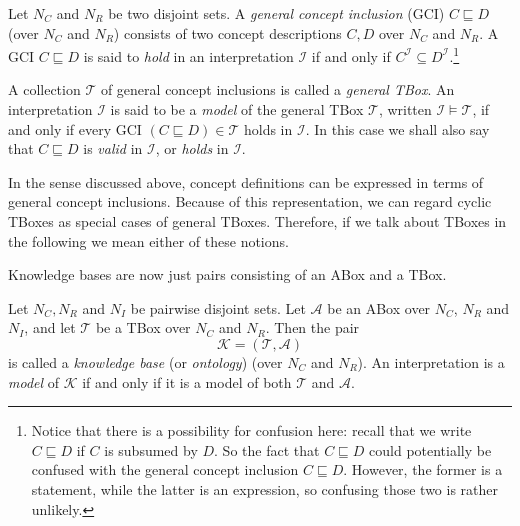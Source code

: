 \begin{Definition}
  \label{def:general-concept-inclusions-and-general-TBoxes}
  Let $N_C$ and $N_R$ be two disjoint sets.  A \emph{general concept inclusion} (GCI) $C
  \sqsubseteq D$ (over $N_C$ and $N_R$) consists of two concept descriptions $C, D$ over
  $N_C$ and $N_R$.  A GCI $C \sqsubseteq D$ is said to \emph{hold} in an interpretation
  $\mathcal{I}$ if and only if $C^{\mathcal{I}} \subseteq
  D^{\mathcal{I}}$.\footnote{Notice that there is a possibility for confusion here: recall
    that we write $C \sqsubseteq D$ if $C$ is subsumed by $D$.  So the fact that $C
    \sqsubseteq D$ could potentially be confused with the general concept inclusion $C
    \sqsubseteq D$.  However, the former is a statement, while the latter is an
    expression, so confusing those two is rather unlikely.}

  A collection $\mathcal{T}$ of general concept inclusions is called a \emph{general
    TBox}.  An interpretation $\mathcal{I}$ is said to be a \emph{model} of the general
  TBox $\mathcal{T}$, written $\mathcal{I} \models \mathcal{T}$, if and only if every GCI
  $(C \sqsubseteq D) \in \mathcal{T}$ holds in $\mathcal{I}$.  In this case we shall also
  say that $C \sqsubseteq D$ is \emph{valid} in $\mathcal{I}$, or \emph{holds} in
  $\mathcal{I}$.
\end{Definition}

In the sense discussed above, concept definitions can be expressed in terms of general
concept inclusions.  Because of this representation, we can regard cyclic TBoxes as
special cases of general TBoxes.  Therefore, if we talk about TBoxes in the following we
mean either of these notions.

Knowledge bases are now just pairs consisting of an ABox and a TBox.
\begin{Definition}
  \label{def:knowledge-base}
  Let $N_C, N_R$ and $N_I$ be pairwise disjoint sets.  Let $\mathcal{A}$ be an ABox over
  $N_C$, $N_R$ and $N_I$, and let $\mathcal{T}$ be a TBox over $N_C$ and $N_R$.  Then the
  pair
  \begin{equation*}
    \mathcal{K} = (\mathcal{T}, \mathcal{A})
  \end{equation*}
  is called a \emph{knowledge base} (or \emph{ontology}) (over $N_C$ and $N_R$).  An
  interpretation is a \emph{model} of $\mathcal{K}$ if and only if it is a model of both
  $\mathcal{T}$ and $\mathcal{A}$.
\end{Definition}


